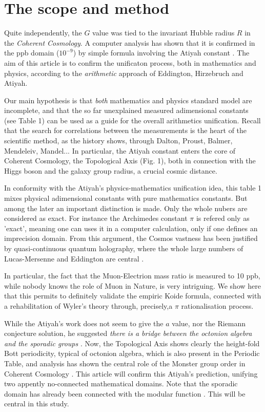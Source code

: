 \documentclass[preprint,12pt]{elsarticle}
\begin{document}
\section{The scope and method}
   Quite independently, the $G$ value was tied to the invariant Hubble radius $R$ in the \textit {Coherent Cosmology}. A computer analysis has shown that it is confirmed in the ppb domain ($10^{-9}$) by simple formula involving the Atiyah constant \cite{Sanchez}. The aim of this article is to confirm the unificaton process, both in mathematics and physics, according to the \textit {arithmetic} approach of Eddington, Hirzebruch and Atiyah.
   
   Our main hypothesis is that \textit{both} mathematics and physics standard model are incomplete, and that the so far unexplained measured adimensional constants (see Table 1) can be used as a guide for the overall arithmetics unification. Recall that the search for correlations between the measurements is the heart of the scientific method, as the history shows, through Dalton, Proust, Balmer, Mendeleiv, Mandel... In particular, the Atiyah constant  enters the core of Coherent Cosmology, the Topological Axis (Fig. 1), both in connection with the Higgs boson and the galaxy group radius, a crucial cosmic distance.
   
   
   In conformity with the Atiyah's physics-mathematics unification idea, this table 1 mixes physical adimensional constants \cite{Tanabashi} with pure mathematics constants. But among the later an important distinction is made. Only the whole nubers are considered as exact. For instance the Archimedes constant $\pi$ is refered only as 'exact', meaning one can uses it in a computer calculation, only if one defines an imprecision domain. From this argument, the Cosmos vastness has been justified by  quasi-continuous quantum holography, where the whole large numbers of Lucas-Mersenne \cite{Bastin} and Eddington \cite{Eddington} are central \cite{Sanchez}.  
      
   In particular, the fact that the Muon-Electrion mass ratio is measured to 10 ppb, while nobody knows the role of Muon in Nature, is very intriguing. We show here that this permits to definitely validate the empiric Koide formula, connected with a rehabilitation of Wyler's theory through, precisely,a $\pi$ rationalisation process. 
   
   While the Atiyah's work does not seem to give the $a$ value, nor the Riemann conjecture solution, he suggested \textit{there is a bridge between the octonion algebra and the sporadic groups} \cite{Atiyah1}. Now, the Topological Axis shows clearly the height-fold Bott periodicity, typical of octonion algebra, which is also present in the Periodic Table, and analysis has shown the central role of the Monster group order in Coherent Cosmology \cite{Sanchez}. This article will confirm this Atiyah's prediction, unifying two appently no-connected mathematical domains. Note that the sporadic domain has already been connected with the modular function \cite{Conway} \cite{Borcherds}. This will be central in this study.
       
\end{document}
